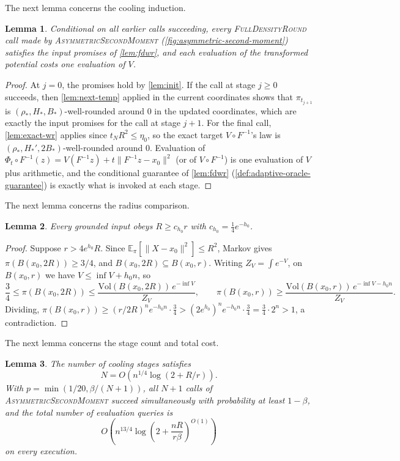 \documentclass[11pt]{article}
\numberwithin{equation}{section}
\newtheorem{lemma}{Lemma}[section]
\theoremstyle{definition}
\newcommand{\Vol}{\mathrm{Vol}}
\newcommand{\E}[2]{\mathbb{E}_{#1}\left[#2\right]}
\newcommand{\algname}[1]{\textnormal{\textsc{#1}}}
\begin{document}
The next lemma concerns the cooling induction.

\begin{lemma}
\label{lem:induction}
Conditional on all earlier calls succeeding, every
\algname{FullDensityRound} call made by
\algname{AsymmetricSecondMoment} (\cref{fig:asymmetric-second-moment})
satisfies the input promises of \cref{lem:fdwr}, and each evaluation of the
transformed potential costs one evaluation of $V$.
\end{lemma}

\begin{proof}
At $j=0$, the promises hold by \cref{lem:init}.
If the call at stage $j\geq0$ succeeds, then \cref{lem:next-temp} applied in the
current coordinates shows that
$\pi_{t_{j+1}}$ is
$(\rho_*,H_*,B_*)$-well-rounded around
$0$ in the updated coordinates, which are exactly the input promises for the
call at stage
$j+1$.
For the final call, \cref{lem:exact-wr} applies since $t_NR^2\leq\eta_0$, so the
exact target
$V\circ F^{-1}$'s law is
$(\rho_*,H_*',2B_*)$-well-rounded around
$0$.
Evaluation of $\Phi_t\circ F^{-1}(z)=V(F^{-1}z)+t\|F^{-1}z-x_0\|^2$ (or of
$V\circ F^{-1}$) is one evaluation of
$V$ plus arithmetic, and the conditional guarantee of \cref{lem:fdwr}
(\cref{def:adaptive-oracle-guarantee}) is exactly what is invoked at each stage.
\end{proof}

The next lemma concerns the radius comparison.

\begin{lemma}
\label{lem:Rr}
Every grounded input obeys $R\geq c_{h_0}r$ with
$c_{h_0}=\frac14e^{-h_0}$.
\end{lemma}

\begin{proof}
Suppose $r>4e^{h_0}R$.
Since $\E{\pi}{\|X-x_0\|^2}\leq R^2$, Markov gives
$\pi(B(x_0,2R))\geq3/4$, and
$B(x_0,2R)\subseteq B(x_0,r)$.
Writing $Z_V=\int e^{-V}$, on
$B(x_0,r)$ we have
$V\leq\inf V+h_0n$, so
\[
\frac34
\leq\pi(B(x_0,2R))
\leq\frac{\Vol(B(x_0,2R))\,e^{-\inf V}}{Z_V},
\qquad
\pi(B(x_0,r)) \geq\frac{\Vol(B(x_0,r))\,e^{-\inf V-h_0n}}{Z_V}.
\]
Dividing,
$\pi(B(x_0,r))\geq(r/2R)^ne^{-h_0n}\cdot\frac34 >(2e^{h_0})^ne^{-h_0n}\cdot\frac34 =\frac34\cdot2^n>1$,
a contradiction.
\end{proof}

The next lemma concerns the stage count and total cost.

\begin{lemma}
\label{lem:count}
The number of cooling stages satisfies
\[
N=O(n^{1/4}\log(2+R/r)).
\]
With
$p=\min(1/20,\beta/(N+1))$, all
$N+1$ calls of
\algname{AsymmetricSecondMoment} succeed simultaneously with
probability at least $1-\beta$, and the total number of evaluation queries is
\[
 O\left(n^{13/4}\log\left(2+\frac{nR}{r\beta}\right)^{O(1)}\right)
\]
on every execution.
\end{lemma}
\end{document}
